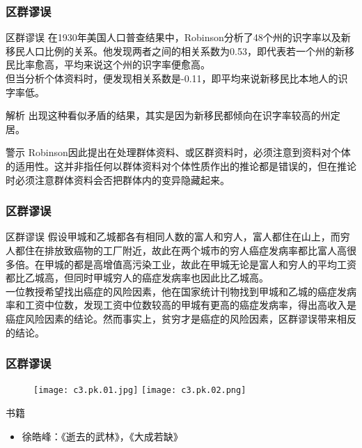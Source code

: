\begin{frame}
  \frametitle{区群谬误}
  \begin{block}{区群谬误}
在1930年美国人口普查结果中，Robinson分析了48个州的识字率以及新移民人口比例的关系。他发现两者之间的相关系数为0.53，即代表若一个州的新移民比率愈高，平均来说这个州的识字率便愈高。\\
\vspace{0.5em}
但当分析个体资料时，便发现相关系数是-0.11，即平均来说新移民比本地人的识字率低。\\
  \end{block}
  \pause \pause \pause \pause
  \begin{block}{解析}
出现这种看似矛盾的结果，其实是因为新移民都倾向在识字率较高的州定居。
  \end{block}
  \pause
  \begin{block}{警示}
Robinson因此提出在处理群体资料、或区群资料时，必须注意到资料对个体的适用性。这并非指任何以群体资料对个体性质作出的推论都是错误的，但在推论时必须注意群体资料会否把群体内的变异隐藏起来。
  \end{block}
\end{frame}

\begin{frame}
  \frametitle{区群谬误}
  \begin{block}{区群谬误}
假设甲城和乙城都各有相同人数的富人和穷人，富人都住在山上，而穷人都住在排放致癌物的工厂附近，故此在两个城市的穷人癌症发病率都比富人高很多倍。在甲城的都是高增值高污染工业，故此在甲城无论是富人和穷人的平均工资都比乙城高，但同时甲城穷人的癌症发病率也因此比乙城高。\\
\vspace{1em}
一位教授希望找出癌症的风险因素，他在国家统计刊物找到甲城和乙城的癌症发病率和工资中位数，发现工资中位数较高的甲城有更高的癌症发病率，得出高收入是癌症风险因素的结论。然而事实上，贫穷才是癌症的风险因素，区群谬误带来相反的结论。
  \end{block}
\end{frame}

\begin{frame}
  \frametitle{区群谬误}
  \begin{figure}
    \centering
    \texttt{[image: c3.pk.01.jpg]}\quad
    \texttt{[image: c3.pk.02.png]}
  \end{figure}
  \begin{block}{书籍}
    \begin{itemize}
      \item 徐皓峰：《逝去的武林》，《大成若缺》
    \end{itemize}
  \end{block}
\end{frame}

